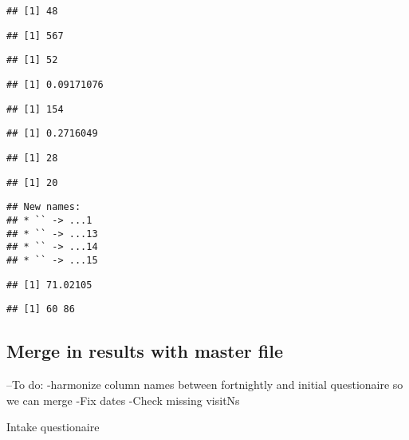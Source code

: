 \documentclass[
]{article}
\begin{document}
\begin{verbatim}
## [1] 48
\end{verbatim}

\begin{verbatim}
## [1] 567
\end{verbatim}

\begin{verbatim}
## [1] 52
\end{verbatim}

\begin{verbatim}
## [1] 0.09171076
\end{verbatim}

\begin{verbatim}
## [1] 154
\end{verbatim}

\begin{verbatim}
## [1] 0.2716049
\end{verbatim}

\begin{verbatim}
## [1] 28
\end{verbatim}

\begin{verbatim}
## [1] 20
\end{verbatim}

\begin{verbatim}
## New names:
## * `` -> ...1
## * `` -> ...13
## * `` -> ...14
## * `` -> ...15
\end{verbatim}

\begin{verbatim}
## [1] 71.02105
\end{verbatim}

\begin{verbatim}
## [1] 60 86
\end{verbatim}

\hypertarget{merge-in-results-with-master-file}{%
\subsection{Merge in results with master
file}\label{merge-in-results-with-master-file}}

--To do: -harmonize column names between fortnightly and initial
questionaire so we can merge -Fix dates -Check missing visitNs

Intake questionaire
\end{document}
